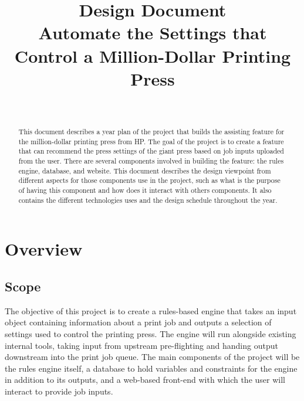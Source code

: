 \documentclass[draftclsnofoot,onecolumn,10pt,compsoc]{IEEEtran}
\begin{document}
\title{%
  Design Document \\[10pt]
  \Large Automate the Settings that Control a Million-Dollar Printing Press}
\author{\vspace{25pt}
\\
}

\maketitle

\vspace{50pt}
\begin{abstract}
This document describes a year plan of the project that builds the assisting feature for the million-dollar printing press from HP. The goal of the project is to create a feature that can recommend the press settings of the giant press based on job inputs uploaded from the user. There are several components involved in building the feature: the rules engine, database, and website. This document describes the design viewpoint from different aspects for those components use in the project, such as what is the purpose of having this component and how does it interact with others components. It also contains the different technologies uses and the design schedule throughout the year.
\end{abstract}

\pagebreak
\tableofcontents

\bigskip
\listoffigures

\pagebreak
\section{Overview}
\subsection{Scope}
The objective of this project is to create a rules-based engine that takes an input object containing information about a print job and outputs a selection of settings used to control the printing press. The engine will run alongside existing internal tools, taking input from upstream pre-flighting and handing output downstream into the print job queue. The main components of the project will be the rules engine itself, a database to hold variables and constraints for the engine in addition to its outputs, and a web-based front-end with which the user will interact to provide job inputs.
\end{document}
